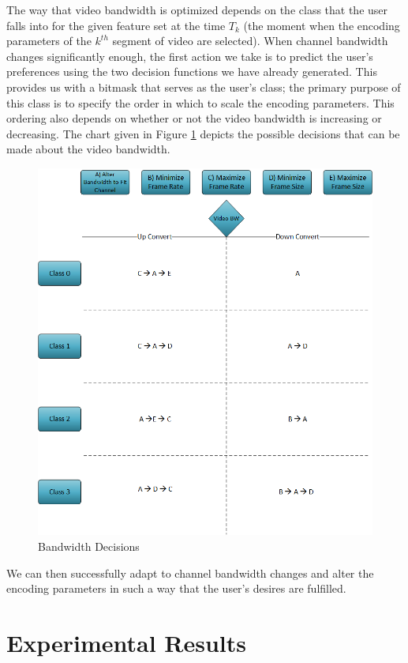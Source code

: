 \documentclass[a4paper,12pt]{article}
\begin{document}
The way that video bandwidth is optimized depends on the class that the user falls into for the given feature set at the time $T_k$ (the moment when the encoding parameters of the $k^{th}$ segment of video are selected). When channel bandwidth changes significantly enough, the first action we take is to predict the user’s preferences using the two decision functions we have already generated. This provides us with a bitmask that serves as the user’s class; the primary purpose of this class is to specify the order in which to scale the encoding parameters. This ordering also depends on whether or not the video bandwidth is increasing or decreasing. The chart given in Figure \ref{fig:ScalingDecisionChart} depicts the possible decisions that can be made about the video bandwidth.
\begin{figure}[h]
\centering
\includegraphics[width=0.7\linewidth]{BandwidthDecisions.png}
\caption{Bandwidth Decisions}
\label{fig:ScalingDecisionChart}
\end{figure}
We can then successfully adapt to channel bandwidth changes and alter the encoding parameters in such a way that the user’s desires are fulfilled.

\section{Experimental Results}
\label{sec:Results}
\end{document}
